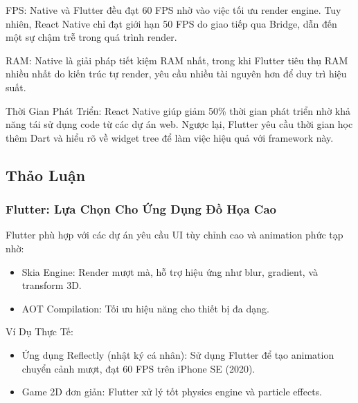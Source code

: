   \begin{flushleft}
      \hspace*{0.8cm}FPS: Native và Flutter đều đạt 60 FPS nhờ vào việc tối ưu render engine. Tuy nhiên, React Native chỉ đạt giới hạn 50 FPS do giao tiếp qua Bridge, dẫn đến một sự chậm trễ trong quá trình render.
  \end{flushleft}

  \begin{flushleft}
      \hspace*{0.8cm}RAM: Native là giải pháp tiết kiệm RAM nhất, trong khi Flutter tiêu thụ RAM nhiều nhất do kiến trúc tự render, yêu cầu nhiều tài nguyên hơn để duy trì hiệu suất.
  \end{flushleft}

  \begin{flushleft}
      \hspace*{0.8cm}Thời Gian Phát Triển: React Native giúp giảm 50\% thời gian phát triển nhờ khả năng tái sử dụng code từ các dự án web. Ngược lại, Flutter yêu cầu thời gian học thêm Dart và hiểu rõ về widget tree để làm việc hiệu quả với framework này.
  \end{flushleft}

\subsection{Thảo Luận}
\renewcommand{\labelitemi}{--}    
\subsubsection{Flutter: Lựa Chọn Cho Ứng Dụng Đồ Họa Cao}
\begin{flushleft}
  \hspace*{0.8cm}Flutter phù hợp với các dự án yêu cầu UI tùy chỉnh cao và animation phức tạp nhờ:
  \setlength{\leftmargini}{1.5cm}
  \begin{itemize}
    \item Skia Engine: Render mượt mà, hỗ trợ hiệu ứng như blur, gradient, và transform 3D.
    \item AOT Compilation: Tối ưu hiệu năng cho thiết bị đa dạng.
  \end{itemize}
\end{flushleft}

\begin{flushleft}
  \hspace*{0.8cm}Ví Dụ Thực Tế:
  \setlength{\leftmargini}{1.5cm}
  \begin{itemize}
      \item Ứng dụng Reflectly (nhật ký cá nhân): Sử dụng Flutter để tạo animation chuyển cảnh mượt, đạt 60 FPS trên iPhone SE (2020).
      \item Game 2D đơn giản: Flutter xử lý tốt physics engine và particle effects.
  \end{itemize}
\end{flushleft}

